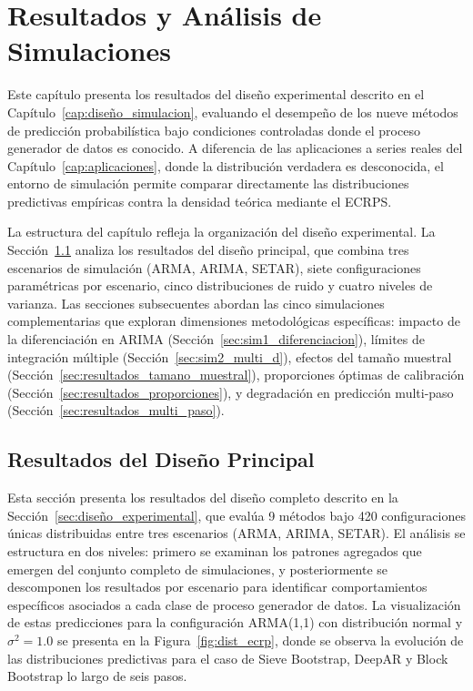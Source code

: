 \chapter{Resultados y Análisis de Simulaciones}
\label{cap:resultados_simulaciones}

Este capítulo presenta los resultados del diseño experimental descrito en el Capítulo~\ref{cap:diseño_simulacion}, evaluando el desempeño de los nueve métodos de predicción probabilística bajo condiciones controladas donde el proceso generador de datos es conocido. A diferencia de las aplicaciones a series reales del Capítulo~\ref{cap:aplicaciones}, donde la distribución verdadera es desconocida, el entorno de simulación permite comparar directamente las distribuciones predictivas empíricas contra la densidad teórica mediante el ECRPS.

La estructura del capítulo refleja la organización del diseño experimental. La Sección~\ref{sec:resultados_principal} analiza los resultados del diseño principal, que combina tres escenarios de simulación (ARMA, ARIMA, SETAR), siete configuraciones paramétricas por escenario, cinco distribuciones de ruido y cuatro niveles de varianza. Las secciones subsecuentes abordan las cinco simulaciones complementarias que exploran dimensiones metodológicas específicas: impacto de la diferenciación en ARIMA (Sección~\ref{sec:sim1_diferenciacion}), límites de integración múltiple (Sección~\ref{sec:sim2_multi_d}), efectos del tamaño muestral (Sección~\ref{sec:resultados_tamano_muestral}), proporciones óptimas de calibración (Sección~\ref{sec:resultados_proporciones}), y degradación en predicción multi-paso (Sección~\ref{sec:resultados_multi_paso}).

\section{Resultados del Diseño Principal}
\label{sec:resultados_principal}

Esta sección presenta los resultados del diseño  completo descrito en la Sección~\ref{sec:diseño_experimental}, que evalúa 9 métodos bajo 420 configuraciones únicas distribuidas entre tres escenarios (ARMA, ARIMA, SETAR). El análisis se estructura en dos niveles: primero se examinan los patrones agregados que emergen del conjunto completo de simulaciones, y posteriormente se descomponen los resultados por escenario para identificar comportamientos específicos asociados a cada clase de proceso generador de datos. La visualización de estas predicciones para la configuración ARMA(1,1) con distribución normal y $\sigma^2=1.0$ se presenta en la Figura~\ref{fig:dist_ecrp}, donde se observa la evolución de las distribuciones predictivas para el caso de Sieve Bootstrap, DeepAR y Block Bootstrap lo largo de seis pasos.

